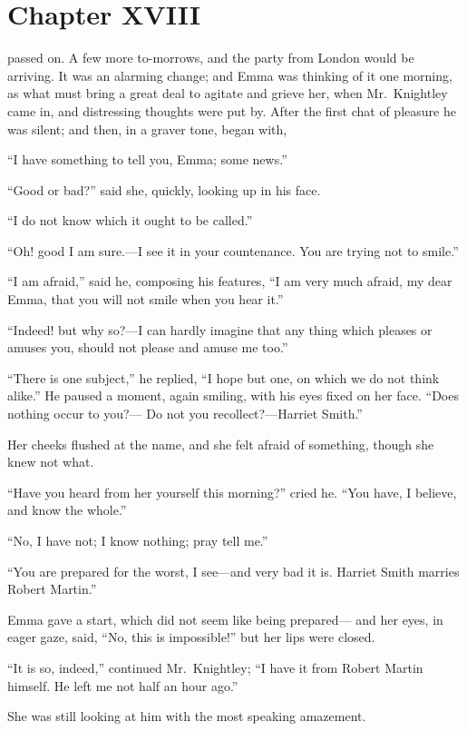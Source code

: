 \chapter{Chapter XVIII}


 passed on.  A few more to-morrows, and the party from London
would be arriving.  It was an alarming change; and Emma was thinking
of it one morning, as what must bring a great deal to agitate and
grieve her, when Mr.\ Knightley came in, and distressing thoughts
were put by.  After the first chat of pleasure he was silent;
and then, in a graver tone, began with,

``I have something to tell you, Emma; some news.''

``Good or bad?'' said she, quickly, looking up in his face.

``I do not know which it ought to be called.''

``Oh! good I am sure.---I see it in your countenance.  You are trying
not to smile.''

``I am afraid,'' said he, composing his features, ``I am very much afraid,
my dear Emma, that you will not smile when you hear it.''

``Indeed! but why so?---I can hardly imagine that any thing which
pleases or amuses you, should not please and amuse me too.''

``There is one subject,'' he replied, ``I hope but one, on which
we do not think alike.''  He paused a moment, again smiling,
with his eyes fixed on her face.  ``Does nothing occur to you?---%
Do not you recollect?---Harriet Smith.''

Her cheeks flushed at the name, and she felt afraid of something,
though she knew not what.

``Have you heard from her yourself this morning?'' cried he.
``You have, I believe, and know the whole.''

``No, I have not; I know nothing; pray tell me.''

``You are prepared for the worst, I see---and very bad it is.
Harriet Smith marries Robert Martin.''

Emma gave a start, which did not seem like being prepared---%
and her eyes, in eager gaze, said, ``No, this is impossible!''
but her lips were closed.

``It is so, indeed,'' continued Mr.\ Knightley; ``I have it from Robert
Martin himself.  He left me not half an hour ago.''

She was still looking at him with the most speaking amazement.

